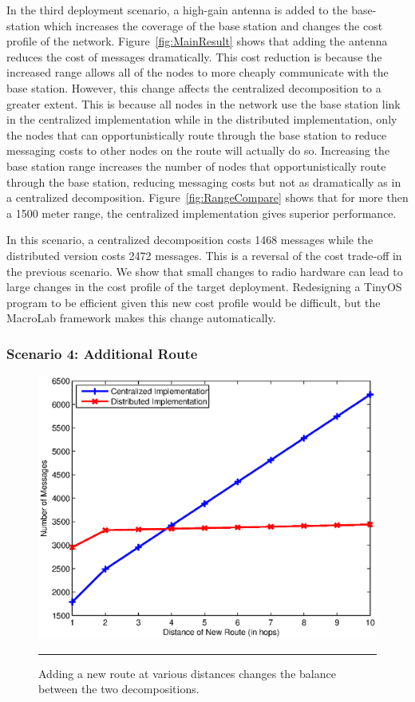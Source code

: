 In the third deployment scenario, a high-gain antenna is added to the
base-station which increases the coverage of the base station and changes
the cost profile of the network.  Figure~\ref{fig:MainResult} shows that
adding the antenna reduces the cost of messages dramatically.  This cost
reduction is because the increased range allows all of the nodes to more
cheaply communicate with the base station.  However, this change affects
the centralized decomposition to a greater extent.  This is because all nodes in the
network use the base station link in the centralized implementation while
in the distributed implementation, only the nodes that can
opportunistically route through the base station to reduce messaging costs
to other nodes on the route will actually do so.  Increasing the base
station range increases the number of nodes that opportunistically route
through the base station, reducing messaging costs but not as dramatically
as in a centralized decomposition. Figure~\ref{fig:RangeCompare} shows
that for more then a 1500 meter range, the centralized implementation gives superior
performance. 

In this scenario, a centralized decomposition costs 1468 messages while the
distributed version costs 2472 messages. This is a reversal of the cost
trade-off in the previous scenario. We show that small changes to radio
hardware can lead to large changes in the cost profile of the target
deployment. Redesigning a TinyOS program to be efficient given this new
cost profile would be difficult, but the MacroLab framework makes this
change automatically.

\subsubsection{Scenario 4: Additional Route} 
\begin{figure}
  \centering
  \includegraphics[width=1\columnwidth]{fig/MovingRoute}
  \smallskip
  \hrule
  \caption[Effect of adding a route to bus tracking application]{Adding a new
    route at various distances changes the balance between the two
    decompositions.}
  \label{fig:MovingRoute}
\end{figure}

